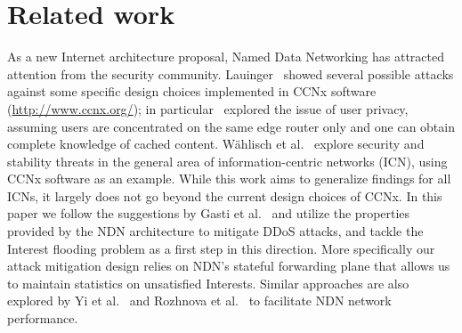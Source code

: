 \documentclass[10pt,conference]{IEEEtran}
\begin{document}
{\section{Related work}
\label{sec:related-work}

As a new Internet architecture proposal, Named Data Networking has attracted attention from the security community. 
Lauinger~\cite{Lauinger:2010:Security--scalability} showed several possible attacks against some specific design choices implemented in CCNx software (\url{http://www.ccnx.org/}); in particular~\cite{Lauinger:2010:Security--scalability} explored the issue of user privacy, assuming users are concentrated on the same edge router only and one can obtain complete knowledge of cached content.  
W\"ahlisch et al.~\cite{Wahlisch:2012:Backscatter-from} explore security and stability threats in the general area of information-centric networks (ICN), using CCNx software as an example.  
While this work aims to generalize findings for all ICNs, it largely does not go beyond the current design choices of CCNx.
In this paper we follow the suggestions by Gasti et al.~\cite{gasti2012ddos} and utilize the properties provided by the NDN architecture to mitigate DDoS attacks, and tackle the Interest flooding problem as a first step in this direction.
More specifically our attack mitigation design relies on NDN's stateful forwarding plane that allows us to
maintain statistics on unsatisfied Interests.  
Similar approaches are also explored by Yi et al.~\cite{adaptive-forwarding,adaptive-tr} and Rozhnova et al.~\cite{rozhnova2012effective} to facilitate NDN network performance.

}
\end{document}
